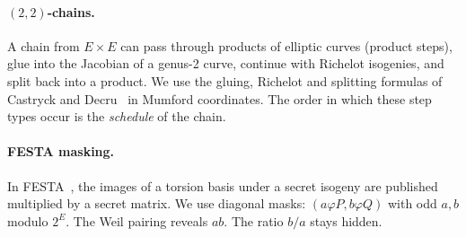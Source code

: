 \paragraph{$(2,2)$-chains.} A chain from $E\times E$ can pass through
products of elliptic curves (product steps), glue into the Jacobian of a
genus-2 curve, continue with Richelot isogenies, and split back into a
product. We use the gluing, Richelot and splitting formulas of Castryck and
Decru~\cite{CD23} in Mumford coordinates. The order in which these step types
occur is the \emph{schedule} of the chain.

\paragraph{FESTA masking.} In FESTA~\cite{BMP23}, the images of a torsion
basis under a secret isogeny are published multiplied by a secret matrix. We
use diagonal masks: $(a\varphi P,b\varphi Q)$ with odd $a,b$ modulo $2^E$. The
Weil pairing reveals $ab$. The ratio $b/a$ stays hidden.
